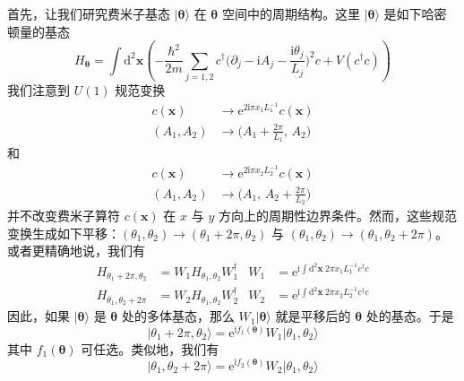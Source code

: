 首先，让我们研究费米子基态 $|\pmb{\theta}\rangle$ 在 $\pmb{\theta}$ 空间中的周期结构。这里 $|\pmb{\theta}\rangle$ 是如下哈密顿量的基态
\begin{equation*}
H_{\pmb{\theta}} = \int \mathrm{d}^{2}\pmb{x} \left( -\frac{\hbar^{2}}{2m} \sum_{j=1,2} c^{\dagger} \Big( \partial_{j} - \mathrm{i} A_{j} - \frac{\mathrm{i} \theta_{j}}{L_{j}} \Big)^{2} c + V(c^{\dagger} c) \right)
\end{equation*}
我们注意到 $U(1)$ 规范变换
\begin{align*}
c(\pmb{x}) &\to \mathrm{e}^{2\mathrm{i}\pi x_{1} L_{1}^{-1}} c(\pmb{x})\\
(A_{1}, A_{2}) &\to \Big( A_{1} + \frac{2\pi}{L_{1}},\, A_{2} \Big)
\end{align*}
和
\begin{align*}
c(\pmb{x}) &\to \mathrm{e}^{2\mathrm{i}\pi x_{2} L_{2}^{-1}} c(\pmb{x})\\
(A_{1}, A_{2}) &\to \Big( A_{1},\, A_{2} + \frac{2\pi}{L_{2}} \Big)
\end{align*}
并不改变费米子算符 $c(\pmb{x})$ 在 $x$ 与 $y$ 方向上的周期性边界条件。然而，这些规范变换生成如下平移：$(\theta_{1}, \theta_{2}) \to (\theta_{1} + 2\pi, \theta_{2})$ 与 $(\theta_{1}, \theta_{2}) \to (\theta_{1}, \theta_{2} + 2\pi)$。或者更精确地说，我们有
\begin{align*}
H_{\theta_{1}+2\pi, \theta_{2}} &= W_{1} H_{\theta_{1}, \theta_{2}} W_{1}^{\dagger}
& W_{1} &= \mathrm{e}^{\mathrm{i} \int \mathrm{d}^{2}\pmb{x}\; 2\pi x_{1} L_{1}^{-1} c^{\dagger} c}\\
H_{\theta_{1}, \theta_{2}+2\pi} &= W_{2} H_{\theta_{1}, \theta_{2}} W_{2}^{\dagger}
& W_{2} &= \mathrm{e}^{\mathrm{i} \int \mathrm{d}^{2}\pmb{x}\; 2\pi x_{2} L_{2}^{-1} c^{\dagger} c}
\end{align*}
因此，如果 $|\pmb{\theta}\rangle$ 是 $\pmb{\theta}$ 处的多体基态，那么 $W_{1}|\pmb{\theta}\rangle$ 就是平移后的 $\pmb{\theta}$ 处的基态。于是
\begin{equation*}
\big| \theta_{1} + 2\pi, \theta_{2} \big\rangle = \mathrm{e}^{\mathrm{i} f_{1}(\pmb{\theta})} W_{1} \big| \theta_{1}, \theta_{2} \big\rangle \tag{4.4.7}
\end{equation*}
其中 $f_{1}(\pmb{\theta})$ 可任选。类似地，我们有
\begin{equation*}
\big| \theta_{1}, \theta_{2} + 2\pi \big\rangle = \mathrm{e}^{\mathrm{i} f_{2}(\pmb{\theta})} W_{2} \big| \theta_{1}, \theta_{2} \big\rangle \tag{4.4.8}
\end{equation*}

